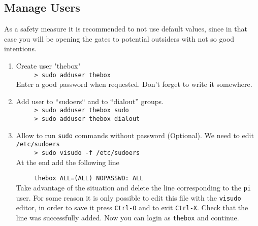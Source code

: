   
  \subsection{Manage Users}
  As a safety measure it is recommended to not use default values, since in that case you will be opening the gates to potential outsiders with not so good intentions.
 \begin{enumerate}
 \item Create user "thebox" \\%
         \verb=     > sudo adduser thebox=\\
     Enter a good password when requested. Don't forget to write it somewhere.
  \item Add user to ``sudoers`` and to ``dialout'' groups.\\
         \verb=     > sudo adduser thebox sudo=\\
         \verb=     > sudo adduser thebox dialout=
  \item Allow to run \verb=sudo= commands without password (Optional). We need to edit \verb=/etc/sudoers=\\
         \verb=     > sudo visudo -f /etc/sudoers=\\
     At the end add the following line
     
         \verb+     thebox ALL=(ALL) NOPASSWD: ALL+\\
     Take advantage of the situation and delete the line corresponding to the \verb=pi= user.
     For some reason it is only possible to edit this file with the \verb=visudo= editor,
     in order to save it press \verb=Ctrl-O= and to exit \verb=Ctrl-X=. Check that the line was
     successfully added. Now you can login as \verb=thebox= and continue.
     
     \end{enumerate}
     
